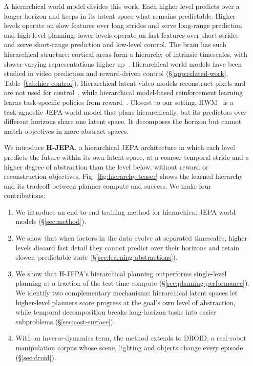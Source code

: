 A hierarchical world model divides this work. Each higher level predicts over a
longer horizon and keeps in its latent space what remains predictable. Higher levels
operate on slow features over long strides and serve long-range prediction and
high-level planning; lower levels operate on fast features over short strides and
serve short-range prediction and low-level control. The brain has such hierarchical structure: cortical areas
form a hierarchy of intrinsic timescales, with slower-varying representations
higher up~\citep{hasson2008temporal,kiebel2008hierarchy,murray2014timescales,baldassano2017event}.
Hierarchical world models have been studied in video prediction and reward-driven
control (\S\ref{app:related-work}, Table~\ref{tab:hier-control}). Hierarchical latent
video models reconstruct pixels and are not used for
control~\citep{saxena2021clockwork,kim2019vta,mounir2023streamer}, while hierarchical
model-based reinforcement learning learns task-specific policies from
reward~\citep{hafner2022director,hansen2025puppeteer,gumbsch2024thick}.
Closest to our setting, HWM~\citep{zhang2026hierarchical} is a task-agnostic JEPA
world model that plans hierarchically, but its predictors over different horizons
share one latent space. It decomposes the horizon but cannot match objectives in
more abstract spaces.

We introduce \textbf{H-JEPA}, a hierarchical JEPA architecture in which each level
predicts the future within its own latent space, at a coarser temporal stride and a
higher degree of abstraction than the level below, without reward or reconstruction
objectives. Fig.~\ref{fig:hierarchy-teaser} shows the learned hierarchy and its
tradeoff between planner compute and success. We make four contributions:

\begin{enumerate}
  \item We introduce an end-to-end training method for hierarchical JEPA world models (\S\ref{sec:method}).

  \item We show that when factors in the data evolve at separated
  timescales, higher levels discard fast detail they cannot predict
  over their horizons and retain slower, predictable state
  (\S\ref{sec:learning-abstractions}).

  \item We show that H-JEPA's hierarchical planning outperforms
  single-level planning at a fraction of the test-time compute
  (\S\ref{sec:planning-performance}). We identify two complementary mechanisms:
  hierarchical latent spaces let higher-level planners score progress at
  the goal's own level of abstraction, while temporal decomposition breaks
  long-horizon tasks into easier subproblems
  (\S\ref{sec:cost-surface}).

  \item With an inverse-dynamics term, the method extends to DROID, a real-robot
  manipulation corpus whose scene, lighting and objects change every
  episode (\S\ref{sec:droid}).
\end{enumerate}

